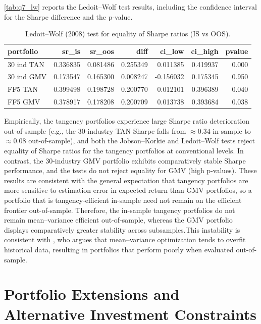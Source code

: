\documentclass[11pt]{exam}
\begin{document}
\autoref{tab:q7_lw} reports the Ledoit--Wolf test results, including the confidence interval for the Sharpe difference and the p-value.

\begin{table}[H]
\centering
\caption{Ledoit--Wolf (2008) test for equality of Sharpe ratios (IS vs OOS).}
\label{tab:q7_lw}
\begin{tabular}{l r r r r r r}
\toprule
portfolio & sr\_is & sr\_oos & diff & ci\_low & ci\_high & pvalue \\
\midrule
30 ind TAN & 0.336835 & 0.081486 & 0.255349 & 0.011385 & 0.419937 & 0.000 \\
30 ind GMV & 0.173547 & 0.165300 & 0.008247 & -0.156032 & 0.175345 & 0.950 \\
FF5 TAN & 0.399498 & 0.198728 & 0.200770 & 0.012101 & 0.396389 & 0.040 \\
FF5 GMV & 0.378917 & 0.178208 & 0.200709 & 0.013738 & 0.393684 & 0.038 \\
\bottomrule
\end{tabular}
\end{table}

\noindent Empirically, the tangency portfolios experience large Sharpe ratio deterioration out-of-sample (e.g., the 30-industry TAN Sharpe falls from $\approx 0.34$ in-sample to $\approx 0.08$ out-of-sample), and both the Jobson--Korkie and Ledoit--Wolf tests reject equality of Sharpe ratios for the tangency portfolios at conventional levels.
In contrast, the 30-industry GMV portfolio exhibits comparatively stable Sharpe performance, and the tests do not reject equality for GMV (high p-values).
These results are consistent with the general expectation that tangency portfolios are more sensitive to estimation error in expected return than GMV portfolios, so a portfolio that is tangency-efficient in-sample need not remain on the efficient frontier out-of-sample. Therefore, the in-sample tangency portfolios do not remain mean–variance efficient out-of-sample, whereas the GMV portfolio displays comparatively greater stability across subsamples.This instability is consistent with \cite{Michaud1989}, who argues that mean–variance optimization tends to overfit historical data, resulting in portfolios that perform poorly when evaluated out-of-sample.

\newpage
\newpage
\section{Portfolio Extensions and Alternative Investment Constraints}
\end{document}
